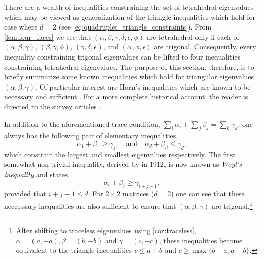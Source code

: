 \documentclass[notitlepage, 10pt]{article}
\begin{document}
There are a wealth of inequalities constraining the set of tetrahedral eigenvalues which may be viewed as generalization of the triangle inequalities which hold for case where $d=2$ (see \cref{eq:quadruplet_triangle_constraints}). 
From \cref{lem:four_faces} we see that $(\alpha,\beta,\gamma,\delta,\epsilon,\phi)$ are tetrahedral only if each of $(\alpha,\beta,\gamma)$, $(\beta, \gamma, \phi)$, $(\gamma,\delta,\epsilon)$, and $(\alpha,\phi,\epsilon)$ are trigonal.
Consequently, every inequality constraining trigonal eigenvalues can be lifted to four inequalities constraining tetrahedral eigenvalues.
The purpose of this section, therefore, is to briefly summarize some known inequalities which hold for triangular eigenvalues $(\alpha,\beta,\gamma)$.
Of particular interest are Horn's inequalities \cite{horn1962eigenvalues} which are known to be necessary and sufficient \cite{klyachko1998stable,knutson1999honeycomb}.
For a more complete historical account, the reader is directed to the survey articles \cite{bhatia2001linear,fulton1998eigenvalues}.

In addition to the aforementioned trace condition, ${\sum}_{i}\alpha_i + {\sum}_{j}\beta_j = {\sum}_{k}\gamma_k$, one always has the following pair of elementary inequalities,
\begin{equation}
    \alpha_1 + \beta_1 \geq \gamma_1, \quad \text{and} \quad \alpha_d + \beta_d \leq \gamma_d,
\end{equation}
which constrain the largest and smallest eigenvalues respectively.
The first somewhat non-trivial inequality, derived by \citeauthor{weyl1912asymptotische} in 1912, is now known as \textit{Weyl's inequality} and states \cite{weyl1912asymptotische}
\begin{equation}
    \alpha_i + \beta_j \geq \gamma_{i+j-1},
\end{equation}
provided that $i+j-1 \leq d$.
For $2\times 2$ matrices ($d=2$) one can see that these neccessary inequalities are also sufficient to ensure that $(\alpha,\beta,\gamma)$ are trigonal.\footnote{After shifting to traceless eigenvalues using \cref{cor:traceless}, $\alpha = (a,-a), \beta = (b, -b)$ and $\gamma = (c,-c)$, these inequalities become equivalent to the triangle inequalities $c \leq a+b$ and $c \geq \max\{b-a,a-b\}$.}
\end{document}

